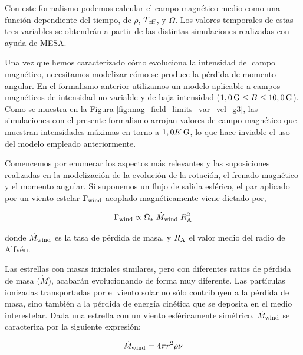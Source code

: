 Con este formalismo podemos calcular el campo magnético medio como una función dependiente del tiempo, de $\rho$, $T_{\mathrm{eff}}$, y $\Omega$. Los valores temporales de estas tres variables se obtendrán a partir de las distintas simulaciones realizadas con ayuda de MESA. \par

Una vez que hemos caracterizado cómo evoluciona la intensidad del campo magnético, necesitamos modelizar cómo se produce la pérdida de momento angular.  En el formalismo anterior utilizamos un modelo aplicable a campos magnéticos de intensidad no variable y de baja intensidad ($1,0\,\mathrm{G} \leq B \leq 10,0\,\mathrm{G}$). Como se muestra en la Figura \ref{fig:mag_field_limits_var_vel_g3}, las simulaciones con el presente formalismo arrojan valores de campo magnético que muestran intensidades máximas en torno a $1,0K\,\mathrm{G}$, lo que hace inviable el uso del modelo empleado anteriormente. \par

Comencemos por enumerar los aspectos más relevantes y las suposiciones realizadas en la modelización de la evolución de la rotación, el frenado magnético y el momento angular. Si suponemos un flujo de salida esférico, el par aplicado por un viento estelar $\Gamma_{\mathrm{wind}}$ acoplado magnéticamente viene dictado por,

\begin{ceqn}
	\begin{equation}
		\Gamma_{\mathrm{wind}} \propto \Omega_* \; \Dot{M}_{\mathrm{wind}} \; R_{\mathrm{A}}^{2} \label{eq:mb_torque}
	\end{equation}
\end{ceqn}

donde $\Dot{M}_{\mathrm{wind}}$ es la tasa de pérdida de masa, y $R_{\mathrm{A}}$ el valor medio del radio de Alfvén. \par

Las estrellas con masas iniciales similares, pero con diferentes ratios de pérdida de masa ($\Dot{M}$), acabarán evolucionando de forma muy diferente. Las partículas ionizadas transportadas por el viento solar no sólo contribuyen a la pérdida de masa, sino también a la pérdida de energía cinética que se deposita en el medio interestelar. Dada una estrella con un viento esféricamente simétrico, $\Dot{M}_{\mathrm{wind}}$ se caracteriza por la siguiente expresión:

\begin{ceqn}
	\begin{equation}
		\Dot{M}_{\mathrm{wind}} = 4\pi r^2\rho\nu \label{eq:mass_loss}
	\end{equation}
\end{ceqn}

